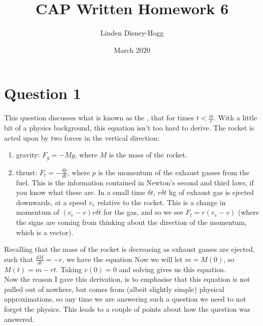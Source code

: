 \documentclass{article}
\title{CAP Written Homework 6}
\author{Linden Disney-Hogg}
\date{March 2020}
\begin{document}
\maketitle

\section{Question 1}
This question discusses what is known as the , that 
for times $t < \frac{m}{r}$. With a little bit of a physics background, this equation isn't too hard to derive. The rocket is acted upon by two forces in the vertical direction:

\begin{enumerate}
    \item gravity: $F_{g} = -Mg$, where $M$ is the mass of the rocket.
    \item thrust: $F_t = -\frac{dp}{dt}$, where $p$ is the momentum of the exhaust gasses from the fuel. This is the information contained in Newton's second and third laws, if you know what these are. In a small time $\delta t$, $r\delta t$ kg of exhaust gas is ejected downwards, at a speed $v_e$ relative to the rocket. This is a change in momentum of $(v_e-v) r \delta t$ for the gas, and so we see $F_t = r(v_e-v)$ (where the signs are coming from thinking about the direction of the momentum, which is a vector). 
\end{enumerate}
Recalling that the mass of the rocket is decreasing as exhaust gasses are ejected, such that $\frac{dM}{dt} =-r$, we have the equation 
Now we will let $m = M(0)$, so $M(t) = m-rt$. Taking $v(0) = 0$ and solving gives us this equation. \\
Now the reason I gave this derivation, is to emphasise that this equation is not pulled out of nowhere, but comes from (albeit slightly simple) physical approximations, so any time we are answering such a question we need to not forget the physics. This leads to a couple of points about how the question was answered.

\end{document}
